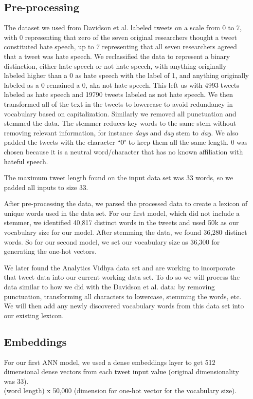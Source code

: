 \documentclass[conference]{sig-alternate-05-2015}
\begin{document}
\subsection{Pre-processing}
The dataset we used from Davidson et al. labeled tweets on a scale from 0 to 7, with 0 representing that zero of the seven original researchers thought a tweet constituted hate speech, up to 7 representing that all seven researchers agreed that a tweet was hate speech. We reclassified the data to represent a binary distinction, either hate speech or not hate speech, with anything originally labeled higher than a 0 as hate speech with the label of 1, and anything originally labeled as a 0 remained a 0, aka not hate speech. This left us with 4993 tweets labeled as hate speech and 19790 tweets labeled as not hate speech.
We then transformed all of the text in the tweets to lowercase to avoid redundancy in vocabulary based on capitalization. 
Similarly we removed all punctuation and stemmed the data. The stemmer reduces key words to the same stem without removing relevant information, for instance \textit{days} and \textit{day} stem to \textit{day}.
We also padded the tweets with the character ``0" to keep them all the same length. 0 was chosen because it is a neutral word/character that has no known affiliation with hateful speech.

The maximum tweet length found on the input data set was 33 words, so we padded all inputs to size 33.

After pre-processing the data, we parsed the processed data to create a lexicon of unique words used in the data set. For our first model, which did not include a stemmer, we identified 40,817 distinct words in the tweets and used 50k as our vocabulary size for our model. After stemming the data, we found 36,280 distinct words. So for our second model, we set our vocabulary size as 36,300 for generating the one-hot vectors.

We later found the Analytics Vidhya data set and are working to incorporate that tweet data into our current working data set. To do so we will process the data similar to how we did with the Davidson et al. data: by removing punctuation, transforming all characters to lowercase, stemming the words, etc. We will then add any newly discovered vocabulary words from this data set into our existing lexicon.

\subsection{Embeddings}
For our first ANN model, we used a dense embeddings layer to get 512 dimensional dense vectors from each tweet input value (original dimensionality was 33).\\ (word length) x 50,000 (dimension for one-hot vector for the vocabulary size).
\end{document}
